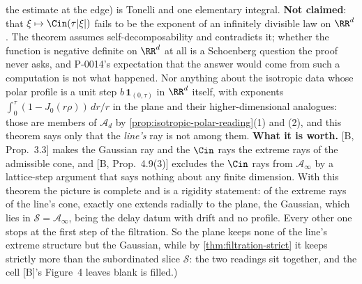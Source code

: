 \begin{theorem}
{the estimate at the edge) is Tonelli and one elementary integral. \textbf{Not claimed}: that
$\xi \mapsto \Cin(\tau|\xi|)$ fails to be the exponent of an infinitely divisible law on $\RR^d$.
The theorem assumes self-decomposability and contradicts it; whether the function is negative
definite on $\RR^d$ at all is a Schoenberg question the proof never asks, and P-0014's
expectation that the answer would come from such a computation is not what happened. Nor anything
about the isotropic data whose polar profile is a unit step $b\,\mathbf{1}_{(0,\tau)}$ in $\RR^d$
itself, with exponents $\int_0^\tau(1 - J_0(r\rho))\,dr/r$ in the plane and their
higher-dimensional analogues: those are members of $\mathcal{A}_d$ by
\ref{prop:isotropic-polar-reading}(1) and (2), and this theorem says only that the \emph{line's}
ray is not among them. \textbf{What it is worth.} [B, Prop.~3.3] makes the Gaussian ray and the
$\Cin$ rays the extreme rays of the admissible cone, and [B, Prop.~4.9(3)] excludes the $\Cin$ rays
from $\mathcal{A}_\infty$ by a lattice-step argument that says nothing about any finite dimension.
With this theorem the picture is complete and is a rigidity statement: of the extreme rays of the
line's cone, exactly one extends radially to the plane, the Gaussian, which lies in
$\mathcal{S} = \mathcal{A}_\infty$, being the delay datum with drift and no profile. Every other one
stops at the first step of the filtration. So the plane keeps none of the line's extreme structure
but the Gaussian, while by \ref{thm:filtration-strict} it keeps strictly more than the
subordinated slice $\mathcal{S}$: the two readings sit together, and the cell [B]'s Figure~4
leaves blank is filled.)}
\end{theorem}


